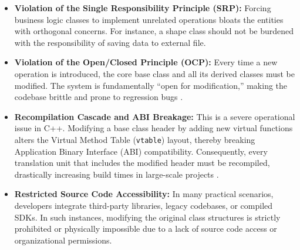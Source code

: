 \begin{itemize}
    \item \textbf{Violation of the Single Responsibility Principle (SRP):} Forcing business logic classes to implement unrelated operations bloats the entities with orthogonal concerns. For instance, a shape class should not be burdened with the responsibility of saving data to external file.
    
    \item \textbf{Violation of the Open/Closed Principle (OCP):} Every time a new operation is introduced, the core base class and all its derived classes must be modified. The system is fundamentally ``open for modification,'' making the codebase brittle and prone to regression bugs \cite{gof1994}.
    
    \item \textbf{Recompilation Cascade and ABI Breakage:} This is a severe operational issue in C++. Modifying a base class header by adding new virtual functions alters the Virtual Method Table (\texttt{vtable}) layout, thereby breaking Application Binary Interface (ABI) compatibility. Consequently, every translation unit that includes the modified header must be recompiled, drastically increasing build times in large-scale projects \cite{iglberger2022}.
    
    \item \textbf{Restricted Source Code Accessibility:} In many practical scenarios, developers integrate third-party libraries, legacy codebases, or compiled SDKs. In such instances, modifying the original class structures is strictly prohibited or physically impossible due to a lack of source code access or organizational permissions.
\end{itemize}
